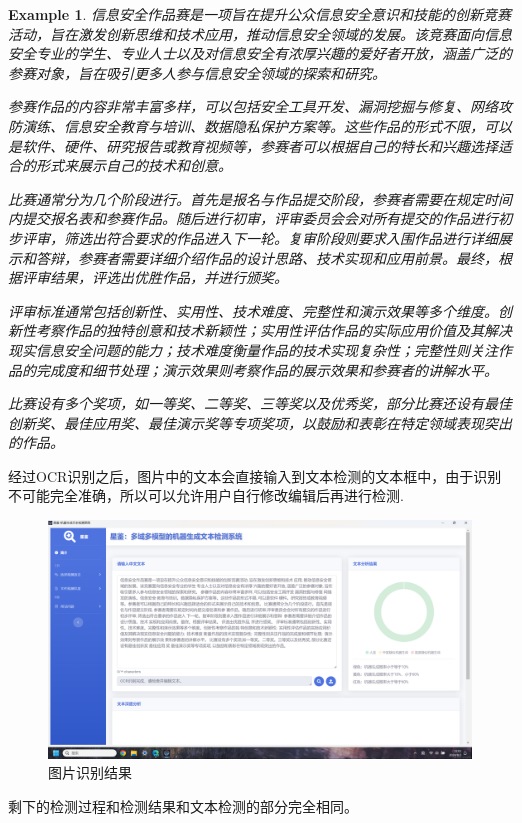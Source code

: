 \documentclass[a4paper]{report}
\newtheorem{example}{Example}
\begin{document}
\begin{example}
	信息安全作品赛是一项旨在提升公众信息安全意识和技能的创新竞赛活动，旨在激发创新思维和技术应用，推动信息安全领域的发展。该竞赛面向信息安全专业的学生、专业人士以及对信息安全有浓厚兴趣的爱好者开放，涵盖广泛的参赛对象，旨在吸引更多人参与信息安全领域的探索和研究。

	参赛作品的内容非常丰富多样，可以包括安全工具开发、漏洞挖掘与修复、网络攻防演练、信息安全教育与培训、数据隐私保护方案等。这些作品的形式不限，可以是软件、硬件、研究报告或教育视频等，参赛者可以根据自己的特长和兴趣选择适合的形式来展示自己的技术和创意。

	比赛通常分为几个阶段进行。首先是报名与作品提交阶段，参赛者需要在规定时间内提交报名表和参赛作品。随后进行初审，评审委员会会对所有提交的作品进行初步评审，筛选出符合要求的作品进入下一轮。复审阶段则要求入围作品进行详细展示和答辩，参赛者需要详细介绍作品的设计思路、技术实现和应用前景。最终，根据评审结果，评选出优胜作品，并进行颁奖。

	评审标准通常包括创新性、实用性、技术难度、完整性和演示效果等多个维度。创新性考察作品的独特创意和技术新颖性；实用性评估作品的实际应用价值及其解决现实信息安全问题的能力；技术难度衡量作品的技术实现复杂性；完整性则关注作品的完成度和细节处理；演示效果则考察作品的展示效果和参赛者的讲解水平。

	比赛设有多个奖项，如一等奖、二等奖、三等奖以及优秀奖，部分比赛还设有最佳创新奖、最佳应用奖、最佳演示奖等专项奖项，以鼓励和表彰在特定领域表现突出的作品。
\end{example}
经过OCR识别之后，图片中的文本会直接输入到文本检测的文本框中，由于识别不可能完全准确，所以可以允许用户自行修改编辑后再进行检测.
\begin{figure}[H]
	\centering
	\includegraphics[width=\textwidth]{figures/OCR_result.png}
	\caption{图片识别结果}
\end{figure}
剩下的检测过程和检测结果和文本检测的部分完全相同。
\end{document}
